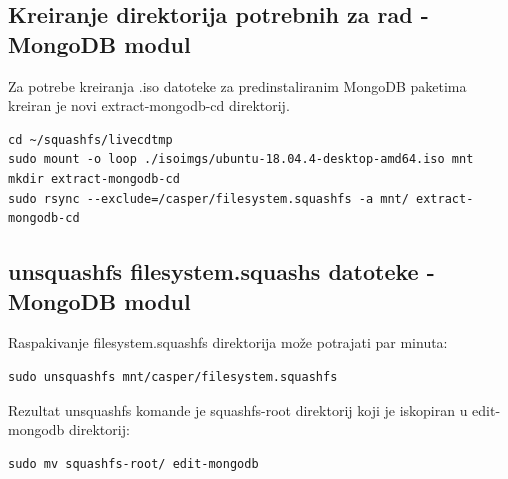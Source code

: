 \documentclass[12pt,vi]{mitthesis}
\begin{document}
\subsection*{Kreiranje direktorija potrebnih za rad - MongoDB modul}
\indent
Za potrebe kreiranja .iso datoteke za predinstaliranim MongoDB paketima kreiran je novi extract-mongodb-cd direktorij.
\begin{lstlisting}[style=BashInputStyle]
cd ~/squashfs/livecdtmp
sudo mount -o loop ./isoimgs/ubuntu-18.04.4-desktop-amd64.iso mnt
mkdir extract-mongodb-cd
sudo rsync --exclude=/casper/filesystem.squashfs -a mnt/ extract-mongodb-cd
\end{lstlisting}

\subsection*{unsquashfs filesystem.squashs datoteke - MongoDB modul}
\noindent
Raspakivanje filesystem.squashfs direktorija može potrajati par minuta:\\
\begin{lstlisting}[style=BashInputStyle]
sudo unsquashfs mnt/casper/filesystem.squashfs
\end{lstlisting}
Rezultat unsquashfs komande je squashfs-root direktorij koji je iskopiran u edit-mongodb direktorij:
\begin{lstlisting}[style=BashInputStyle]
sudo mv squashfs-root/ edit-mongodb
\end{lstlisting}
\end{document}
